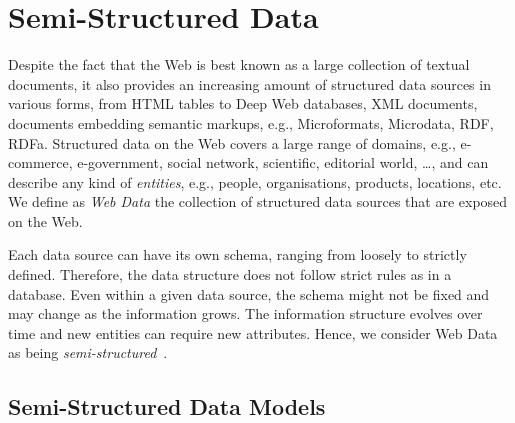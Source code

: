 \chapter{Semi-Structured Data}
\label{chap:ssd}

Despite the fact that the Web is best known as a large collection of textual documents, it also provides an increasing amount of structured data sources in various forms, from HTML tables to Deep Web databases, XML documents, documents embedding semantic markups, e.g., Microformats, Microdata, RDF, RDFa. Structured data on the Web covers a large range of domains, e.g., e-commerce, e-government, social network, scientific, editorial world, \ldots, and can describe any kind of \emph{entities}, e.g., people, organisations, products, locations, etc. We define as \emph{Web Data} the collection of structured data sources that are exposed on the Web.

Each data source can have its own schema, ranging from loosely to strictly defined. Therefore, the data structure does not follow strict rules as in a database. Even within a given data source, the schema might not be fixed and may change as the information grows. The information structure evolves over time and new entities can require new attributes. Hence, we consider Web Data as being \emph{semi-structured}~\cite{abiteboul:1997:icdt}.

%

\section{Semi-Structured Data Models}

